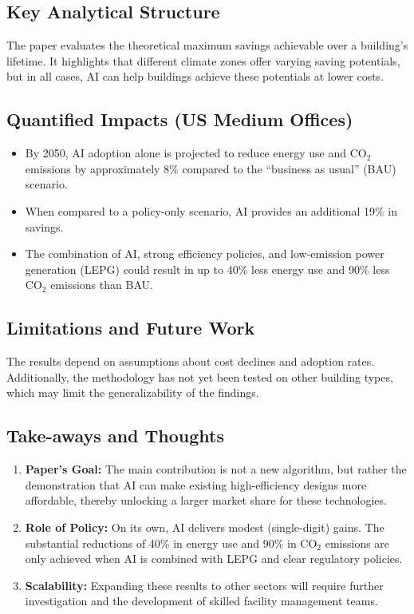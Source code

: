 \documentclass[conference,a4paper]{IEEEtran}
\begin{document}
\subsection*{Key Analytical Structure}
The paper evaluates the theoretical maximum savings achievable over a building’s lifetime. It highlights that different climate zones offer varying saving potentials, but in all cases, AI can help buildings achieve these potentials at lower costs.

\subsection*{Quantified Impacts (US Medium Offices)}
\begin{itemize}
    \item By 2050, AI adoption alone is projected to reduce energy use and CO$_2$ emissions by approximately 8\% compared to the “business as usual” (BAU) scenario.
    \item When compared to a policy-only scenario, AI provides an additional 19\% in savings.
    \item The combination of AI, strong efficiency policies, and low-emission power generation (LEPG) could result in up to 40\% less energy use and 90\% less CO$_2$ emissions than BAU.
\end{itemize}

\subsection*{Limitations and Future Work}
The results depend on assumptions about cost declines and adoption rates. Additionally, the methodology has not yet been tested on other building types, which may limit the generalizability of the findings.

\subsection*{Take-aways and Thoughts}
\begin{enumerate}
    \item \textbf{Paper’s Goal:} The main contribution is not a new algorithm, but rather the demonstration that AI can make existing high-efficiency designs more affordable, thereby unlocking a larger market share for these technologies.
    \item \textbf{Role of Policy:} On its own, AI delivers modest (single-digit) gains. The substantial reductions of 40\% in energy use and 90\% in CO$_2$ emissions are only achieved when AI is combined with LEPG and clear regulatory policies.
    \item \textbf{Scalability:} Expanding these results to other sectors will require further investigation and the development of skilled facility management teams.
\end{enumerate}
\end{document}
